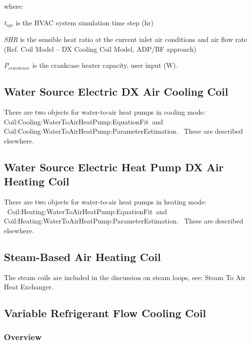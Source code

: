 where:

\emph{t\(_{sys}\)} is the HVAC system simulation time step (hr)

\emph{SHR} is the sensible heat ratio at the current inlet air conditions and air flow rate (Ref. Coil Model -- DX Cooling Coil Model, ADP/BF approach)

\emph{P\(_{crankcase}\)} is the crankcase heater capacity, user input (W).

\subsection{Water Source Electric DX Air Cooling Coil}\label{water-source-electric-dx-air-cooling-coil}

There are two objects for water-to-air heat pumps in cooling mode: \\ Coil:Cooling:WaterToAirHeatPump:EquationFit~and~\\
Coil:Cooling:WaterToAirHeatPump:ParameterEstimation.~ These are described elsewhere.

\subsection{Water Source Electric Heat Pump DX Air Heating Coil}\label{water-source-electric-heat-pump-dx-air-heating-coil}

There are two objects for water-to-air heat pumps in heating mode: \\ ~Coil:Heating:WaterToAirHeatPump:EquationFit~and~\\
Coil:Heating:WaterToAirHeatPump:ParameterEstimation.~ These are described elsewhere.

\subsection{Steam-Based Air Heating Coil}\label{steam-based-air-heating-coil}

The steam coils are included in the discussion on steam loops, see: Steam To Air Heat Exchanger.

\subsection{Variable Refrigerant Flow Cooling Coil}\label{variable-refrigerant-flow-cooling-coil}

\subsubsection{Overview}\label{overview-12}

